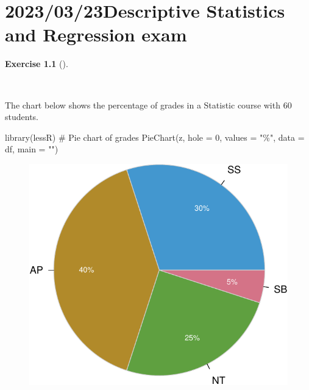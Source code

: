 \documentclass[
  a4paper,
]{scrreport}
\newenvironment{Shaded}{\begin{snugshade}}{\end{snugshade}}
\newcommand{\AttributeTok}[1]{\textcolor[rgb]{0.40,0.45,0.13}{#1}}
\newcommand{\CommentTok}[1]{\textcolor[rgb]{0.37,0.37,0.37}{#1}}
\newcommand{\DecValTok}[1]{\textcolor[rgb]{0.68,0.00,0.00}{#1}}
\newcommand{\FunctionTok}[1]{\textcolor[rgb]{0.28,0.35,0.67}{#1}}
\newcommand{\NormalTok}[1]{\textcolor[rgb]{0.00,0.23,0.31}{#1}}
\newcommand{\StringTok}[1]{\textcolor[rgb]{0.13,0.47,0.30}{#1}}
\theoremstyle{definition}
\newtheorem{exercise}{Exercise}[chapter]
\theoremstyle{remark}
\begin{document}

\hypertarget{descriptive-statistics-and-regression-exam-2}{%
\chapter{\texorpdfstring{2023/03/23Descriptive Statistics and Regression
exam}{2023/03/23 Descriptive Statistics and Regression exam}}\label{descriptive-statistics-and-regression-exam-2}}

\begin{exercise}[]\protect\hypertarget{exr-1}{}\label{exr-1}

~

The chart below shows the percentage of grades in a Statistic course
with 60 students.

\begin{Shaded}
\begin{Highlighting}[]
\FunctionTok{library}\NormalTok{(lessR)}
\CommentTok{\# Pie chart of grades}
\FunctionTok{PieChart}\NormalTok{(z, }\AttributeTok{hole =} \DecValTok{0}\NormalTok{, }\AttributeTok{values =} \StringTok{"\%"}\NormalTok{, }\AttributeTok{data =}\NormalTok{ df, }\AttributeTok{main =} \StringTok{""}\NormalTok{)}
\end{Highlighting}
\end{Shaded}

\begin{figure}[H]

{\centering \includegraphics{img/exam-2023-03-23/pie-chart-scores-1.pdf}

}
\end{figure}
\end{exercise}
\end{document}
